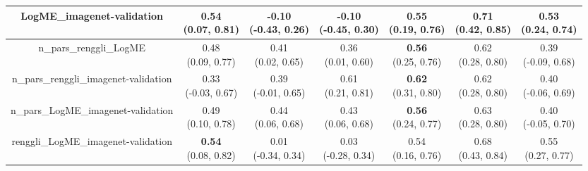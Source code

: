 \begin{table}[H]
\begin{tabular}{c|cccccc}
\hline
LogME_imagenet-validation & \makecell{0.54 \\[0pt] (0.07, 0.81)} & \makecell{-0.10 \\[0pt] (-0.43, 0.26)} & \makecell{-0.10 \\[0pt] (-0.45, 0.30)} & \makecell{\textbf{0.55} \\[0pt] (0.19, 0.76)} & \makecell{0.71 \\[0pt] (0.42, 0.85)} & \makecell{0.53 \\[0pt] (0.24, 0.74)} \\
\hline
n_pars_renggli_LogME & \makecell{0.48 \\[0pt] (0.09, 0.77)} & \makecell{0.41 \\[0pt] (0.02, 0.65)} & \makecell{0.36 \\[0pt] (0.01, 0.60)} & \makecell{\textbf{0.56} \\[0pt] (0.25, 0.76)} & \makecell{0.62 \\[0pt] (0.28, 0.80)} & \makecell{0.39 \\[0pt] (-0.09, 0.68)} \\
\hline
n_pars_renggli_imagenet-validation & \makecell{0.33 \\[0pt] (-0.03, 0.67)} & \makecell{0.39 \\[0pt] (-0.01, 0.65)} & \makecell{0.61 \\[0pt] (0.21, 0.81)} & \makecell{\textbf{0.62} \\[0pt] (0.31, 0.80)} & \makecell{0.62 \\[0pt] (0.28, 0.80)} & \makecell{0.40 \\[0pt] (-0.06, 0.69)} \\
\hline
n_pars_LogME_imagenet-validation & \makecell{0.49 \\[0pt] (0.10, 0.78)} & \makecell{0.44 \\[0pt] (0.06, 0.68)} & \makecell{0.43 \\[0pt] (0.06, 0.68)} & \makecell{\textbf{0.56} \\[0pt] (0.24, 0.77)} & \makecell{0.63 \\[0pt] (0.28, 0.80)} & \makecell{0.40 \\[0pt] (-0.05, 0.70)} \\
\hline
renggli_LogME_imagenet-validation & \makecell{\textbf{0.54} \\[0pt] (0.08, 0.82)} & \makecell{0.01 \\[0pt] (-0.34, 0.34)} & \makecell{0.03 \\[0pt] (-0.28, 0.34)} & \makecell{0.54 \\[0pt] (0.16, 0.76)} & \makecell{0.68 \\[0pt] (0.43, 0.84)} & \makecell{0.55 \\[0pt] (0.27, 0.77)} \\

\end{tabular}
\end{table}
